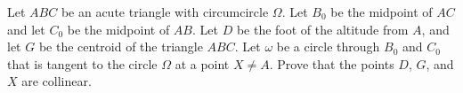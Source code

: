 Let $ABC$ be an acute triangle with circumcircle $\Omega$. Let $B_0$ be the midpoint of $AC$ and let $C_0$ be the midpoint of $AB$. Let $D$ be the foot of the altitude from $A$, and let $G$ be the centroid of the triangle $ABC$. Let $\omega$ be a circle through $B_0$ and $C_0$ that is tangent to the circle $\Omega$ at a point $X \neq A$. Prove that the points $D$, $G$, and $X$ are collinear.
